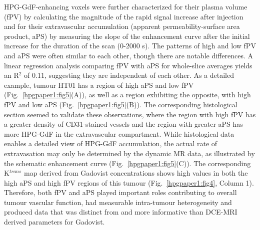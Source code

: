 \acs{HPG-GdF}-enhancing voxels were further characterized for their plasma volume (\acs{fPV}) by calculating the magnitude of the rapid signal increase after injection and for their extravascular accumulation (apparent permeability-surface area product, \acs{aPS}) by measuring the slope of the enhancement curve after the initial increase for the duration of the scan (0-2000 s).
The patterns of high and low \acs{fPV} and \acs{aPS} were often similar to each other, though there are notable differences.
A linear regression analysis comparing \acs{fPV} with \acs{aPS} for whole-slice averages yields an R$^2$ of 0.11, suggesting they are independent of each other.
As a detailed example, tumour HT01 has a region of high \acs{aPS} and low \acs{fPV} (Fig.~\ref{hpgpaper1:fig5}(A)), as well as a region exhibiting the opposite, with high \acs{fPV} and low \acs{aPS} (Fig.~\ref{hpgpaper1:fig5}(B)).
The corresponding histological section seemed to validate these observations, where the region with high \acs{fPV} has a greater density of \acs{CD31}-stained vessels and the region with greater \acs{aPS} has more \acs{HPG-GdF} in the extravascular compartment.
While histological data enables a detailed view of \acs{HPG-GdF} accumulation, the actual rate of extravasation may only be determined by the dynamic MR data, as illustrated by the schematic enhancement curve (Fig.~\ref{hpgpaper1:fig5}(C)).
The corresponding K$^{trans}$ map derived from Gadovist concentrations shows high values in both the high \acs{aPS} and high \acs{fPV} regions of this tumour (Fig.~\ref{hpgpaper1:fig4}, Column 1).
Therefore, both \acs{fPV} and \acs{aPS} played important roles contributing to overall tumour vascular function, had measurable intra-tumour heterogeneity and produced data that was distinct from and more informative than \acs{DCE-MRI} derived parameters for Gadovist.
